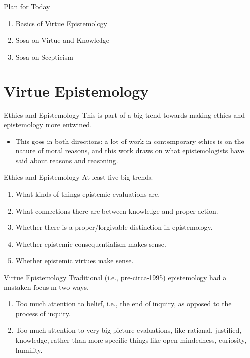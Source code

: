 \documentclass[
  17pt,
  letterpaper,
  ignorenonframetext,
  aspectratio=169,
]{beamer}
\providecommand{\tightlist}{%
  \setlength{\itemsep}{0pt}\setlength{\parskip}{0pt}}\usepackage{longtable,booktabs,array}
\begin{document}
\begin{frame}{Plan for Today}
\protect\hypertarget{plan-for-today}{}
\begin{enumerate}[<+->]
\tightlist
\item
  Basics of Virtue Epistemology
\item
  Sosa on Virtue and Knowledge
\item
  Sosa on Scepticism
\end{enumerate}
\end{frame}

\hypertarget{virtue-epistemology}{%
\section{Virtue Epistemology}\label{virtue-epistemology}}

\begin{frame}{Ethics and Epistemology}
\protect\hypertarget{ethics-and-epistemology}{}
This is part of a big trend towards making ethics and epistemology more
entwined.

\begin{itemize}[<+->]
\tightlist
\item
  This goes in both directions: a lot of work in contemporary ethics is
  on the nature of moral reasons, and this work draws on what
  epistemologists have said about reasons and reasoning.
\end{itemize}
\end{frame}

\begin{frame}{Ethics and Epistemology}
\protect\hypertarget{ethics-and-epistemology-1}{}
At least five big trends.

\begin{enumerate}[<+->]
\tightlist
\item
  What kinds of things epistemic evaluations are.
\item
  What connections there are between knowledge and proper action.
\item
  Whether there is a proper/forgivable distinction in epistemology.
\item
  Whether epistemic consequentialism makes sense.
\item
  Whether epistemic virtues make sense.
\end{enumerate}
\end{frame}

\begin{frame}{Virtue Epistemology}
\protect\hypertarget{virtue-epistemology-1}{}
Traditional (i.e., pre-circa-1995) epistemology had a mistaken focus in
two ways.

\begin{enumerate}[<+->]
\tightlist
\item
  Too much attention to belief, i.e., the end of inquiry, as opposed to
  the process of inquiry.
\item
  Too much attention to very big picture evaluations, like rational,
  justified, knowledge, rather than more specific things like
  open-mindedness, curiosity, humility.
\end{enumerate}
\end{frame}
\end{document}
